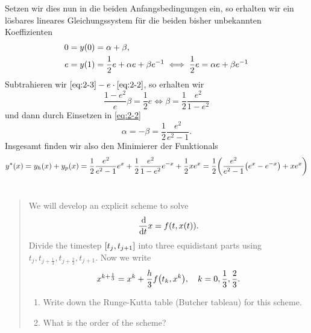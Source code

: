 \documentclass{exercise}
\begin{document}
	Setzen wir dies nun in die beiden Anfangsbedingungen ein, so erhalten wir ein lösbares lineares Gleichungssystem für die beiden bisher unbekannten Koeffizienten
	\begin{align}
		0 &= y\parentheses*{0} = \alpha + \beta,\label{eq:2-2}\\
		e &= y\parentheses*{1} = \frac{1}{2}e + \alpha e + \beta e^{-1} \iff \frac{1}{2}e = \alpha e + \beta e^{-1}\label{eq:2-3}
	\end{align}
	Subtrahieren wir \(\eqref{eq:2-3} - e \cdot \eqref{eq:2-2}\), so erhalten wir
	\[
		\frac{1 - e^2}{e}\beta = \frac{1}{2}e \iff \beta = \frac{1}{2}\frac{e^2}{1 - e^2}
	\]
	und dann durch Einsetzen in \eqref{eq:2-2}
	\[
		\alpha = -\beta = \frac{1}{2}\frac{e^2}{e^2 - 1}.
	\]
	Insgesamt finden wir also den Minimierer der Funktionals
	\[
		y^*\parentheses*{x} = y_h\parentheses*{x} + y_p\parentheses*{x} = \frac{1}{2}\frac{e^2}{e^2 - 1}e^x + \frac{1}{2}\frac{e^2}{1 - e^2}e^{-x} + \frac{1}{2}xe^x = \frac{1}{2}\parentheses*{\frac{e^2}{e^2 - 1}\parentheses*{e^x - e^{-x}} + xe^x}
	\]


	\section{}

	\begin{quote}
		We will develop an explicit scheme to solve
		\[
			\frac{\d}{\d t}x = f\parentheses*{t, x\parentheses*{t}}.
		\]
		Divide the timestep \(\brackets*{t_j, t_{j + 1}}\) into three equidistant parts using \(t_j, t_{j + \frac{1}{3}}, t_{j + \frac{2}{3}}, t_{j + 1}\).
		Now we write
		\[
			x^{k + \frac{1}{3}} = x^k + \frac{h}{3}f\parentheses*{t_k, x^k}, \quad k = 0, \frac{1}{3}, \frac{2}{3}.
		\]
		\begin{enumerate}
			\item Write down the Runge-Kutta table (Butcher tableau) for this scheme.
			\item What is the order of the scheme?
		\end{enumerate}
	\end{quote}
\end{document}
